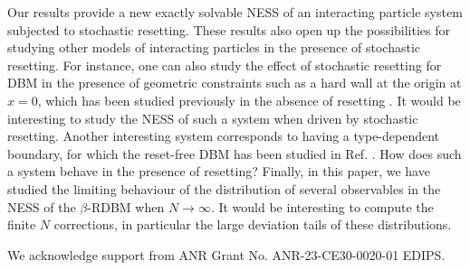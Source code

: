\documentclass[onecolumn,superscriptaddress,
 amsmath,amssymb,
 aps,
 prd,
]{revtex4-1}
\begin{document}
\vspace*{0.3cm} 
Our results provide a new exactly solvable NESS of an interacting particle system subjected to stochastic resetting. These results also open up the possibilities for studying other models of interacting particles in the presence of stochastic resetting.  
For instance, one can also study the effect of stochastic resetting for DBM in the presence of geometric constraints such as a hard wall at the origin at $x=0$, which has been studied previously in the absence of resetting \cite{M1984,RS11,Bor09,NM09}. It would be interesting to study the NESS of such a system when driven by stochastic resetting. Another interesting system corresponds to having a type-dependent boundary, for which the reset-free DBM has been studied in Ref. \cite{Gautie}. How does such a system behave in the presence of resetting? 
Finally, in this paper, we have studied 
the limiting behaviour of the distribution of several observables in the NESS of the $\beta$-RDBM when $N \to \infty$. It would be interesting to compute the finite $N$ corrections, in particular the large deviation tails of these distributions. 


\begin{acknowledgements}
We acknowledge support from ANR Grant No. ANR-23-CE30-0020-01 EDIPS.
\end{acknowledgements}


\newpage
\end{document}
